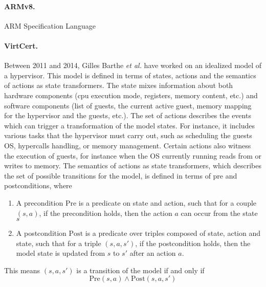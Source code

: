 \paragraph{ARMv8.}
%
ARM Specification Language
%

\paragraph{VirtCert.}
%
Between 2011 and 2014, Gilles Barthe \emph{et al.} have worked on an idealized
model of a hypervisor.
%
This model is defined in terms of states, actions and the semantics of actions
as state trans\-formers.
%
The state mixes information about both hardware components (\ac{cpu} execution
mode, registers, memory content, etc.) and software components (list of guests,
the current active guest, memory mapping for the hypervisor and the guests,
etc.).
%
The set of actions describes the events which can trigger a transformation of
the model states.
%
For instance, it includes various tasks that the hypervisor must carry out, such
as scheduling the guests OS, hypercalls handling, or memory management.
%
Certain actions also witness the execution of guests, for instance when the OS
currently running reads from or writes to memory.
%
The semantics of actions as state transformers, which describes the set of
possible transitions for the model, is defined in terms of pre and
postconditions, where
%
\begin{enumerate}
\item A precondition \( \mathrm{Pre} \) is a predicate on state and action, such
  that for a couple \( (s, a) \), if the precondition holds, then the action
  \( a \) can occur from the state \( s \)
\item A postcondition \( \mathrm{Post} \) is a predicate over triples composed
  of state, action and state, such that for a triple \( (s, a, s') \), if the
  postcondition holds, then the model state is updated from \( s \) to \( s' \)
  after an action \( a \).
\end{enumerate}
%
This means \( (s, a, s') \) is a transition of the model if and only if
%
\[
  \mathrm{Pre}(s, a) \wedge \mathrm{Post}(s, a, s')
\]

